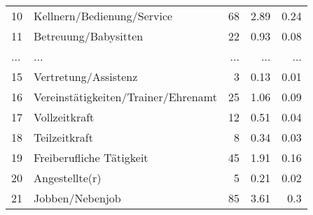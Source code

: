 \begin{longtable}{lXrrr}
        10 & \multicolumn{1}{X}{Kellnern/Bedienung/Service} & %
          \num{68} &
          \num[round-mode=places,round-precision=2]{2.89} &
          \num[round-mode=places,round-precision=2]{0.24} \\
        11 & \multicolumn{1}{X}{Betreuung/Babysitten} & %
          \num{22} &
          \num[round-mode=places,round-precision=2]{0.93} &
          \num[round-mode=places,round-precision=2]{0.08} \\
       ... & ... & ... & ... & ... \\
        15 & \multicolumn{1}{X}{Vertretung/Assistenz} & %
          \num{3} &
          \num[round-mode=places,round-precision=2]{0.13} &
          \num[round-mode=places,round-precision=2]{0.01} \\

        16 & \multicolumn{1}{X}{Vereinstätigkeiten/Trainer/Ehrenamt} & %
          \num{25} &
          \num[round-mode=places,round-precision=2]{1.06} &
          \num[round-mode=places,round-precision=2]{0.09} \\

        17 & \multicolumn{1}{X}{Vollzeitkraft} & %
          \num{12} &
          \num[round-mode=places,round-precision=2]{0.51} &
          \num[round-mode=places,round-precision=2]{0.04} \\

        18 & \multicolumn{1}{X}{Teilzeitkraft} & %
          \num{8} &
          \num[round-mode=places,round-precision=2]{0.34} &
          \num[round-mode=places,round-precision=2]{0.03} \\

        19 & \multicolumn{1}{X}{Freiberufliche Tätigkeit} & %
          \num{45} &
          \num[round-mode=places,round-precision=2]{1.91} &
          \num[round-mode=places,round-precision=2]{0.16} \\

        20 & \multicolumn{1}{X}{Angestellte(r)} & %
          \num{5} &
          \num[round-mode=places,round-precision=2]{0.21} &
          \num[round-mode=places,round-precision=2]{0.02} \\

        21 & \multicolumn{1}{X}{Jobben/Nebenjob} & %
          \num{85} &
          \num[round-mode=places,round-precision=2]{3.61} &
          \num[round-mode=places,round-precision=2]{0.3} \\


\end{longtable}
